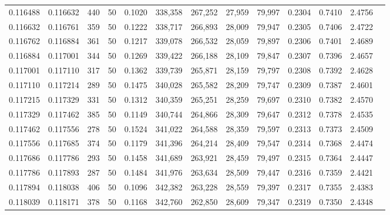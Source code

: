 \begin{tabular}{rrrrrrrrrrrrr}
0.116488 & 0.116632 &   440 &  50 &                                     0.1020 & 338,358 & 267,252 &  27,959 &  79,997 & 0.2304 & 0.7410 & 2.4756 \\
0.116632 & 0.116761 &   359 &  50 &                                     0.1222 & 338,717 & 266,893 &  28,009 &  79,947 & 0.2305 & 0.7406 & 2.4722 \\
0.116762 & 0.116884 &   361 &  50 &                                     0.1217 & 339,078 & 266,532 &  28,059 &  79,897 & 0.2306 & 0.7401 & 2.4689 \\
0.116884 & 0.117001 &   344 &  50 &                                     0.1269 & 339,422 & 266,188 &  28,109 &  79,847 & 0.2307 & 0.7396 & 2.4657 \\
0.117001 & 0.117110 &   317 &  50 &                                     0.1362 & 339,739 & 265,871 &  28,159 &  79,797 & 0.2308 & 0.7392 & 2.4628 \\
0.117110 & 0.117214 &   289 &  50 &                                     0.1475 & 340,028 & 265,582 &  28,209 &  79,747 & 0.2309 & 0.7387 & 2.4601 \\
0.117215 & 0.117329 &   331 &  50 &                                     0.1312 & 340,359 & 265,251 &  28,259 &  79,697 & 0.2310 & 0.7382 & 2.4570 \\
0.117329 & 0.117462 &   385 &  50 &                                     0.1149 & 340,744 & 264,866 &  28,309 &  79,647 & 0.2312 & 0.7378 & 2.4535 \\
0.117462 & 0.117556 &   278 &  50 &                                     0.1524 & 341,022 & 264,588 &  28,359 &  79,597 & 0.2313 & 0.7373 & 2.4509 \\
0.117556 & 0.117685 &   374 &  50 &                                     0.1179 & 341,396 & 264,214 &  28,409 &  79,547 & 0.2314 & 0.7368 & 2.4474 \\
0.117686 & 0.117786 &   293 &  50 &                                     0.1458 & 341,689 & 263,921 &  28,459 &  79,497 & 0.2315 & 0.7364 & 2.4447 \\
0.117786 & 0.117893 &   287 &  50 &                                     0.1484 & 341,976 & 263,634 &  28,509 &  79,447 & 0.2316 & 0.7359 & 2.4421 \\
0.117894 & 0.118038 &   406 &  50 &                                     0.1096 & 342,382 & 263,228 &  28,559 &  79,397 & 0.2317 & 0.7355 & 2.4383 \\
0.118039 & 0.118171 &   378 &  50 &                                     0.1168 & 342,760 & 262,850 &  28,609 &  79,347 & 0.2319 & 0.7350 & 2.4348 \\

\end{tabular}
